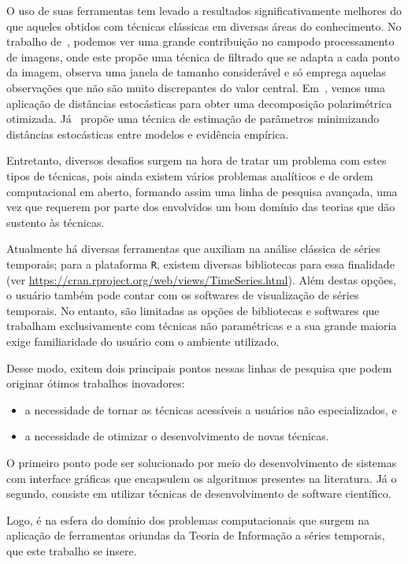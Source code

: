 O uso de suas ferramentas tem levado a resultados significativamente melhores do que aqueles obtidos com técnicas clássicas em diversas áreas do conhecimento. No trabalho de~\cite{Torres2014}, podemos ver uma grande contribuição no campodo processamento de imagens, onde este propõe uma técnica de filtrado que se adapta a cada ponto da imagem, observa uma janela de tamanho considerável e só emprega aquelas observações que não são muito discrepantes do valor central. Em~\cite{Bhattacharya2015}, vemos uma aplicação de distâncias estocásticas para obter uma decomposição polarimétrica otimizada. Já~ \cite{Gambini2015} propõe uma técnica de estimação de parâmetros minimizando distâncias estocásticas entre modelos e evidência empírica.

Entretanto, diversos desafios surgem na hora de tratar um problema com estes tipos de técnicas, pois ainda existem vários problemas analíticos e de ordem computacional em aberto, formando assim uma linha de pesquisa avançada, uma vez que requerem por parte dos envolvidos um bom domínio das teorias que dão sustento às técnicas.

Atualmente há diversas ferramentas que auxiliam na análise clássica de séries temporais; para a plataforma \texttt  R, existem diversas bibliotecas para essa finalidade (ver \url{https://cran.rproject.org/web/views/TimeSeries.html}). Além destas opções, o usuário também pode contar com os softwares de visualização de séries temporais. No entanto, são limitadas as opções de bibliotecas e softwares que trabalham exclusivamente com técnicas não paramétricas e a sua grande maioria exige familiaridade do usuário com o ambiente utilizado.

Desse modo, exitem dois principais pontos nessas linhas de pesquisa que podem originar ótimos trabalhos inovadores:

\begin{itemize}
\item a necessidade de tornar as técnicas acessíveis a usuários não especializados, e
\item a necessidade de otimizar o desenvolvimento de novas técnicas.
\end{itemize}

O primeiro ponto pode ser solucionado por meio do desenvolvimento de sistemas com interface gráficas que encapsulem os algoritmos presentes na literatura. Já o segundo, consiste em utilizar técnicas de desenvolvimento de software científico.

Logo, é na esfera do domínio dos problemas computacionais que surgem na aplicação de ferramentas oriundas da Teoria de Informação a séries temporais, que este trabalho se insere.
 
